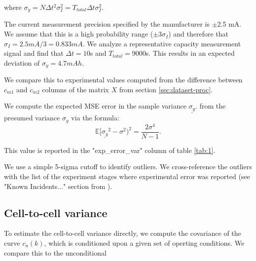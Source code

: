 \documentclass[conference]{IEEEtran}
\newcommand{\E}{\mathbb{E}}
\begin{document}
where $\sigma_y = N \Delta t^2 \sigma_I^2 = T_{total} \Delta t \sigma_I^2$.

The current measurement precision specified by the manufacturer
is $\pm$2.5 mA. We assume that this is a high probability range
($\pm 3 \sigma_I$) and therefore that $\sigma_I = 2.5mA / 3 = 0.833 mA$.
We analyze a representative capacity measurement signal and find
that $\Delta t = 10$s and $T_{total} = 9000$s. This results
in an expected deviation of $\sigma_y = 4.7 mAh$.




We compare this to experimental values computed from the difference
between $c_{m1}$ and $c_{m2}$ columns of the matrix $X$ from section
\ref{sec:dataset-proc}.

We compute the expected MSE error in the sample variance $\underline{\sigma_y}$.
from the presumed variance $\sigma_y$
via the formula:
\begin{equation*}
    \E[\underline{\sigma_y}^2 - \sigma^2)^2 = \frac{2 \sigma^4}{N-1}.
\end{equation*}

This value is reported in the "exp\_error\_var" column of table \ref{tab:1}.



We use a simple 5-sigma cutoff to identify outliers. We cross-reference
the outliers with the list of the experiment stages where experimental
error was reported (see "Known Incidents..." section from
\cite{stroebl_multi-stage_2024}). 

\subsection{Cell-to-cell variance}
To estimate the cell-to-cell variance directly, we
compute the covariance of the curve $c_u(k)$, which is conditioned
upon a given set of operting conditions. We compare this to
the unconditional 
\end{document}
